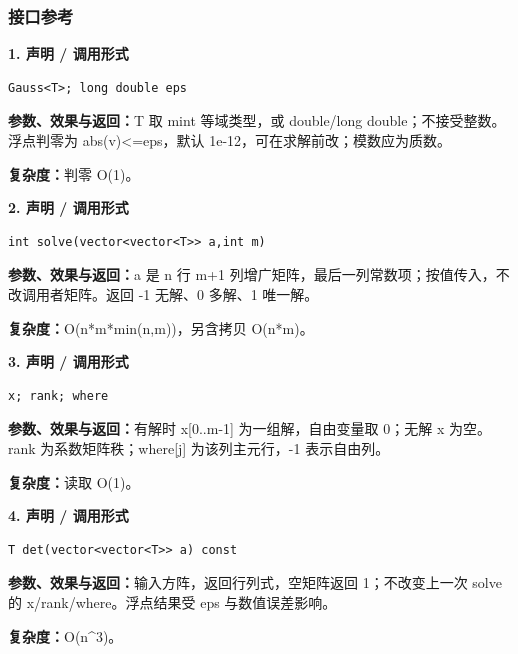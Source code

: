 \documentclass[UTF8,a4paper,10pt]{ctexart}
\begin{document}
\subsubsection*{接口参考}
\noindent\begin{minipage}{\textwidth}
\textbf{1. 声明 / 调用形式}
\begin{lstlisting}
Gauss<T>; long double eps
\end{lstlisting}
\textbf{参数、效果与返回：}T 取 mint 等域类型，或 double/long double；不接受整数。浮点判零为 abs(v)<=eps，默认 1e-12，可在求解前改；模数应为质数。

\textbf{复杂度：}判零 O(1)。

\end{minipage}\par\vspace{0.4em}
\noindent\begin{minipage}{\textwidth}
\textbf{2. 声明 / 调用形式}
\begin{lstlisting}
int solve(vector<vector<T>> a,int m)
\end{lstlisting}
\textbf{参数、效果与返回：}a 是 n 行 m+1 列增广矩阵，最后一列常数项；按值传入，不改调用者矩阵。返回 -1 无解、0 多解、1 唯一解。

\textbf{复杂度：}O(n*m*min(n,m))，另含拷贝 O(n*m)。

\end{minipage}\par\vspace{0.4em}
\noindent\begin{minipage}{\textwidth}
\textbf{3. 声明 / 调用形式}
\begin{lstlisting}
x; rank; where
\end{lstlisting}
\textbf{参数、效果与返回：}有解时 x[0..m-1] 为一组解，自由变量取 0；无解 x 为空。rank 为系数矩阵秩；where[j] 为该列主元行，-1 表示自由列。

\textbf{复杂度：}读取 O(1)。

\end{minipage}\par\vspace{0.4em}
\noindent\begin{minipage}{\textwidth}
\textbf{4. 声明 / 调用形式}
\begin{lstlisting}
T det(vector<vector<T>> a) const
\end{lstlisting}
\textbf{参数、效果与返回：}输入方阵，返回行列式，空矩阵返回 1；不改变上一次 solve 的 x/rank/where。浮点结果受 eps 与数值误差影响。

\textbf{复杂度：}O(n\textasciicircum{}3)。

\end{minipage}\par\vspace{0.4em}
\end{document}
